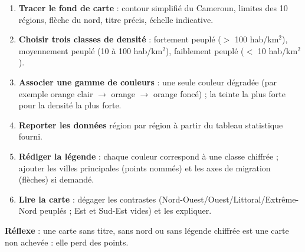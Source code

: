 \documentclass[11pt]{article}
\begin{document}
\begin{methode}
\begin{enumerate}
\item \textbf{Tracer le fond de carte} : contour simplifié du Cameroun, limites des 10 régions, flèche du nord, titre précis, échelle indicative.
\item \textbf{Choisir trois classes de densité} : fortement peuplé ($>$ 100 hab/km$^2$), moyennement peuplé (10 à 100 hab/km$^2$), faiblement peuplé ($<$ 10 hab/km$^2$).
\item \textbf{Associer une gamme de couleurs} : une seule couleur dégradée (par exemple orange clair $\rightarrow$ orange $\rightarrow$ orange foncé) ; la teinte la plus forte pour la densité la plus forte.
\item \textbf{Reporter les données} région par région à partir du tableau statistique fourni.
\item \textbf{Rédiger la légende} : chaque couleur correspond à une classe chiffrée ; ajouter les villes principales (points nommés) et les axes de migration (flèches) si demandé.
\item \textbf{Lire la carte} : dégager les contrastes (Nord-Ouest/Ouest/Littoral/Extrême-Nord peuplés ; Est et Sud-Est vides) et les expliquer.
\end{enumerate}
\textbf{Réflexe} : une carte sans titre, sans nord ou sans légende chiffrée est une carte non achevée : elle perd des points.
\end{methode}
\end{document}

